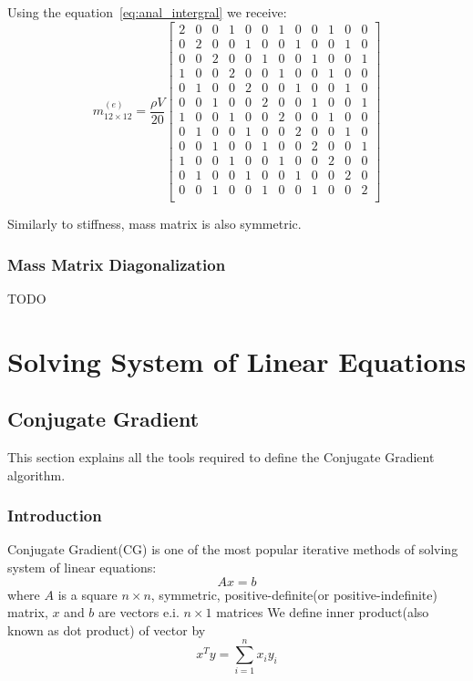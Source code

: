 \documentclass[en]{minipw} %
\begin{document}
Using the equation~\ref{eq:anal_intergral} we receive:
\begin{equation}
m^{(e)}_{12 \times 12} = \dfrac{\rho V}{20}
\begin{bmatrix}
2 & 0 & 0 & 1 & 0 & 0 & 1 & 0 & 0 & 1 & 0 & 0 \\
0 & 2 & 0 & 0 & 1 & 0 & 0 & 1 & 0 & 0 & 1 & 0 \\
0 & 0 & 2 & 0 & 0 & 1 & 0 & 0 & 1 & 0 & 0 & 1 \\
1 & 0 & 0 & 2 & 0 & 0 & 1 & 0 & 0 & 1 & 0 & 0 \\
0 & 1 & 0 & 0 & 2 & 0 & 0 & 1 & 0 & 0 & 1 & 0 \\
0 & 0 & 1 & 0 & 0 & 2 & 0 & 0 & 1 & 0 & 0 & 1 \\
1 & 0 & 0 & 1 & 0 & 0 & 2 & 0 & 0 & 1 & 0 & 0 \\
0 & 1 & 0 & 0 & 1 & 0 & 0 & 2 & 0 & 0 & 1 & 0 \\
0 & 0 & 1 & 0 & 0 & 1 & 0 & 0 & 2 & 0 & 0 & 1 \\
1 & 0 & 0 & 1 & 0 & 0 & 1 & 0 & 0 & 2 & 0 & 0 \\
0 & 1 & 0 & 0 & 1 & 0 & 0 & 1 & 0 & 0 & 2 & 0 \\
0 & 0 & 1 & 0 & 0 & 1 & 0 & 0 & 1 & 0 & 0 & 2 \\
\end{bmatrix}
\end{equation}

Similarly to stiffness, mass matrix is also symmetric.

\subsection{Mass Matrix Diagonalization}
TODO

\chapter{Solving System of Linear Equations}
\label{chap:system_linear}

\section{Conjugate Gradient}
This section explains all the tools required to define the Conjugate Gradient algorithm.
\subsection{Introduction}
Conjugate Gradient(CG) is one of the most popular iterative methods of solving system of linear equations:
\begin{equation}
Ax=b
\end{equation}
where $A$ is a square $n \times n$, symmetric, positive-definite(or positive-indefinite) matrix, $x$ and $b$ are vectors e.i. $n \times 1$ matrices
We define inner product(also known as dot product) of vector by 
\begin{equation}
x^{T}y = \sum^{n}_{i=1} x_i y_i
\end{equation}
\end{document}
